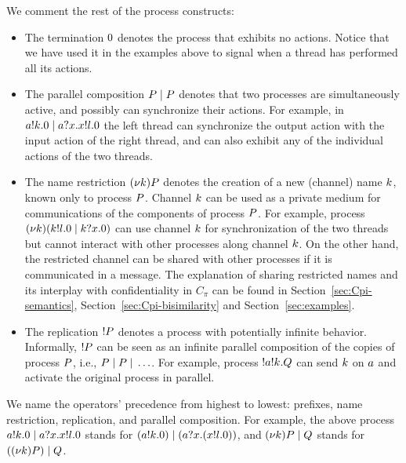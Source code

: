We comment the rest of the process constructs:
\begin{itemize}
\item The termination $0$ denotes the process that exhibits no actions. 
Notice that we have used it in the examples above to signal when a thread has performed all its 
actions.
%
\item The parallel composition $P \;|\; P$ denotes that two processes are simultaneously active, and possibly can synchronize their actions. 
For example, in $a!k.0 \;|\; a?x.x!l.0$ 
the left thread can synchronize the output action with the input action of the right thread, and   
can also exhibit any of the individual actions of the two threads.
%
\item The name restriction $(\nu k)P$ denotes the creation of a new (channel) name $k$, 
known only to process $P$. 
Channel $k$ can be used as a private medium for communications of the components of process $P$. 
For example, process $(\nu k)(k!l.0 \;|\; k?x.0)$ 
can use channel $k$ for synchronization of the two threads but cannot interact with other processes along channel $k$.
On the other hand, the restricted channel can be shared with other processes if it is communicated in a message. 
The explanation of sharing restricted names and its interplay with confidentiality in $C_\pi$ can be found in  Section~\ref{sec:Cpi-semantics}, Section~\ref{sec:Cpi-bisimilarity} and Section~\ref{sec:examples}.
%
\item The replication $! P$ denotes a process with potentially infinite behavior. 
Informally, $! P$ can be seen as an infinite parallel composition of the copies of process 
$P$, i.e., $P\;|\;P\;|\;\ldots$. 
For example, process $! a!k.Q$ can send $k$ on $a$ and activate 
the original process in parallel. %
\end{itemize}


We name the operators' precedence from highest to lowest: prefixes, name restriction, replication, and parallel 
composition. 
For example, the above process 
$a!k.0 \;|\; a?x.x!l.0$ stands for 
$(a!k.0) \;|\; (a?x.(x!l.0))$, 
and $(\nu k)P \;|\; Q$ stands for $((\nu k)P) \;|\; Q$.


